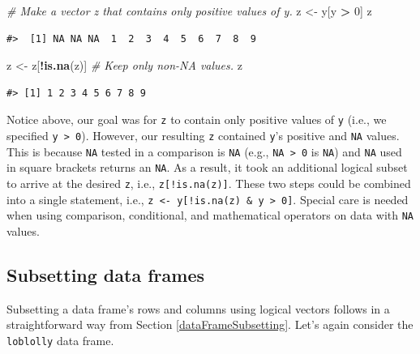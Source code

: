 \documentclass[
  11pt,
]{krantz}
\newenvironment{Shaded}{\begin{snugshade}}{\end{snugshade}}
\newcommand{\CommentTok}[1]{\textcolor[rgb]{0.56,0.35,0.01}{\textit{#1}}}
\newcommand{\DecValTok}[1]{\textcolor[rgb]{0.00,0.00,0.81}{#1}}
\newcommand{\KeywordTok}[1]{\textcolor[rgb]{0.13,0.29,0.53}{\textbf{#1}}}
\newcommand{\NormalTok}[1]{#1}
\newcommand{\OperatorTok}[1]{\textcolor[rgb]{0.81,0.36,0.00}{\textbf{#1}}}
\newcommand{\StringTok}[1]{\textcolor[rgb]{0.31,0.60,0.02}{#1}}
\theoremstyle{definition}
\theoremstyle{definition}
\theoremstyle{definition}
\theoremstyle{definition}
\theoremstyle{remark}
\begin{document}
\begin{Shaded}
\begin{Highlighting}[]
\CommentTok{\# Make a vector z that contains only positive values of y.}
\NormalTok{z \textless{}{-}}\StringTok{ }\NormalTok{y[y }\OperatorTok{\textgreater{}}\StringTok{ }\DecValTok{0}\NormalTok{] }
\NormalTok{z}
\end{Highlighting}
\end{Shaded}

\begin{verbatim}
#>  [1] NA NA NA  1  2  3  4  5  6  7  8  9
\end{verbatim}

\begin{Shaded}
\begin{Highlighting}[]
\NormalTok{z \textless{}{-}}\StringTok{ }\NormalTok{z[}\OperatorTok{!}\KeywordTok{is.na}\NormalTok{(z)] }\CommentTok{\# Keep only non{-}NA values.}
\NormalTok{z}
\end{Highlighting}
\end{Shaded}

\begin{verbatim}
#> [1] 1 2 3 4 5 6 7 8 9
\end{verbatim}

Notice above, our goal was for \texttt{z} to contain only positive values of \texttt{y} (i.e., we specified \texttt{y\ \textgreater{}\ 0}). However, our resulting \texttt{z} contained \texttt{y}'s positive and \texttt{NA} values. This is because \texttt{NA} tested in a comparison is \texttt{NA} (e.g., \texttt{NA\ \textgreater{}\ 0} is \texttt{NA}) and \texttt{NA} used in square brackets returns an \texttt{NA}. As a result, it took an additional logical subset to arrive at the desired \texttt{z}, i.e., \texttt{z{[}!is.na(z){]}}. These two steps could be combined into a single statement, i.e., \texttt{z\ \textless{}-\ y{[}!is.na(z)\ \&\ y\ \textgreater{}\ 0{]}}. Special care is needed when using comparison, conditional, and mathematical operators on data with \texttt{NA} values.

\hypertarget{subsetting-data-frames}{%
\subsection{Subsetting data frames}\label{subsetting-data-frames}}

Subsetting a data frame's rows and columns using logical vectors follows in a straightforward way from Section \ref{dataFrameSubsetting}. Let's again consider the \texttt{loblolly} data frame.
\end{document}
